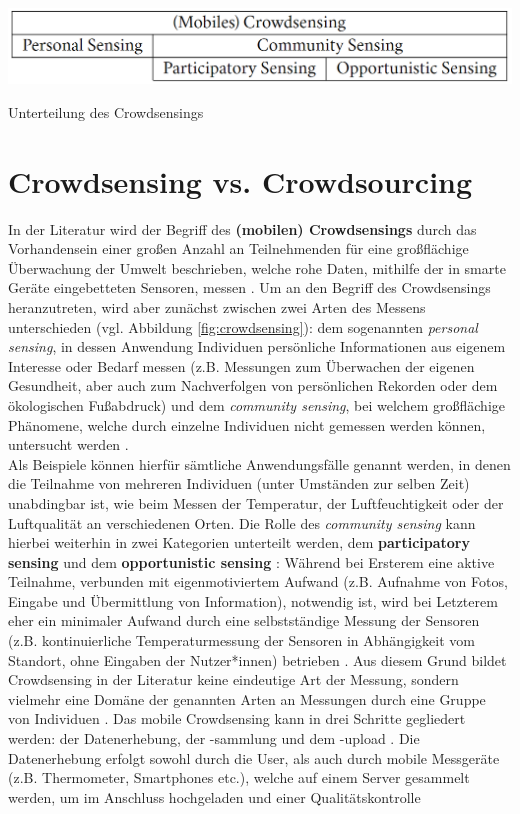 \begin{marginfigure}[] %
    \includegraphics[width=1.1\marginparwidth]{figures/crowdsensing.png}
    \caption{\label{fig:crowdsensing}Unterteilung des Crowdsensings}
\end{marginfigure}

\section{Crowdsensing vs. Crowdsourcing}
\label{sec:crowdsensing}
In der Literatur wird der Begriff des \textbf{(mobilen) Crowdsensings} durch das Vorhandensein einer großen Anzahl an Teilnehmenden für eine großflächige Überwachung der Umwelt beschrieben, welche rohe Daten, mithilfe der in smarte Geräte eingebetteten Sensoren, messen \cite{Ray2022}. Um an den Begriff des Crowdsensings heranzutreten, wird aber zunächst zwischen zwei Arten des Messens unterschieden (vgl. Abbildung \ref{fig:crowdsensing}): dem sogenannten \textit{personal sensing}, in dessen Anwendung Individuen persönliche Informationen aus eigenem Interesse oder Bedarf messen (z.B. Messungen zum Überwachen der eigenen Gesundheit, aber auch zum Nachverfolgen von persönlichen Rekorden oder dem ökologischen Fußabdruck) und dem \textit{community sensing}, bei welchem großflächige Phänomene, welche durch einzelne Individuen nicht gemessen werden können, untersucht werden \cite{Ganti2011}. \\ Als Beispiele können hierfür sämtliche Anwendungsfälle genannt werden, in denen die Teilnahme von mehreren Individuen (unter Umständen zur selben Zeit) unabdingbar ist, wie beim Messen der Temperatur, der Luftfeuchtigkeit oder der Luftqualität an verschiedenen Orten. Die Rolle des \textit{community sensing} kann hierbei weiterhin in zwei Kategorien unterteilt werden, dem \textbf{participatory sensing} \cite{Burke2006} und dem \textbf{opportunistic sensing} \cite{Lane2010}: \newline Während bei Ersterem eine aktive Teilnahme, verbunden mit eigenmotiviertem Aufwand (z.B. Aufnahme von Fotos, Eingabe und Übermittlung von Information), notwendig ist, wird bei Letzterem eher ein minimaler Aufwand durch eine selbstständige Messung der Sensoren (z.B. kontinuierliche Temperaturmessung der Sensoren in Abhängigkeit vom Standort, ohne Eingaben der Nutzer*innen) betrieben \cite{Ganti2011}. Aus diesem Grund bildet Crowdsensing in der Literatur keine eindeutige Art der Messung, sondern vielmehr eine Domäne der genannten Arten an Messungen durch eine Gruppe von Individuen \cite{Ganti2011}. \newline Das mobile Crowdsensing kann in drei Schritte gegliedert werden: der Datenerhebung, der -sammlung und dem -upload \cite{Ray2022}. Die Datenerhebung erfolgt sowohl durch die User, als auch durch mobile Messgeräte (z.B. Thermometer, Smartphones etc.), welche auf einem Server gesammelt werden, um im Anschluss hochgeladen und einer Qualitätskontrolle 